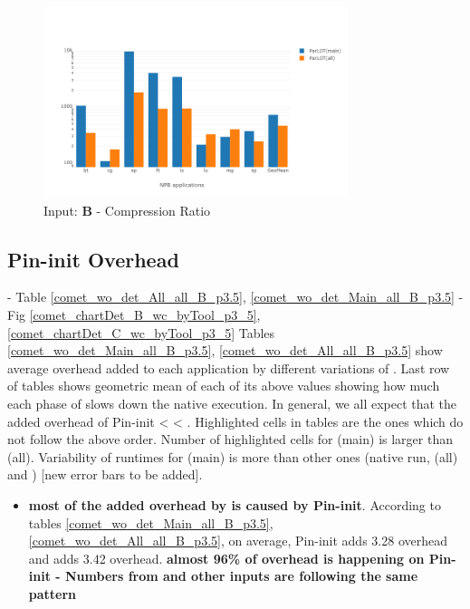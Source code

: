 \begin{figure}[!t]
\centering
\includegraphics[width=3.5in]{figs.comet.newMed/comet_chartAvg_cr_B_p3_5.png}
\caption{ Input: \textbf{B}  - Compression Ratio
}
\label{comet_chartAvg_cr_B_p3_5}
\end{figure}
  
  
\subsection{Pin-init Overhead} 
\label{subsec:pinit}
 - Table \ref{comet_wo_det_All_all_B_p3.5}, \ref{comet_wo_det_Main_all_B_p3.5}
  - Fig \ref{comet_chartDet_B_wc_byTool_p3_5}, \ref{comet_chartDet_C_wc_byTool_p3_5}
   Tables \ref{comet_wo_det_Main_all_B_p3.5}, \ref{comet_wo_det_All_all_B_p3.5} show average overhead added to each application by different variations of \parlot. Last row of tables shows geometric mean of each of its above values showing how much each phase of \parlot slows down the native execution. In general, we all expect that the added overhead of  Pin-init < \parlot < \parlotnc. Highlighted cells in tables are the ones which do not follow the above order. Number of highlighted cells for \parlot(main) is larger than \parlot(all). Variability of runtimes for \parlot(main) is more than other ones (native run, \parlot(all) and \callgrind) [new error bars to be added].
	
	\begin{itemize}
	\item \textbf{most of the added overhead by \parlot is caused by Pin-init}. According to tables \ref{comet_wo_det_Main_all_B_p3.5}, \ref{comet_wo_det_All_all_B_p3.5}, on average, Pin-init adds 3.28 overhead and \parlota adds 3.42 overhead. \textbf{almost 96\% of \parlota overhead is happening on Pin-init - Numbers from \parlotm and other inputs are following the same pattern}
	\end{itemize}


